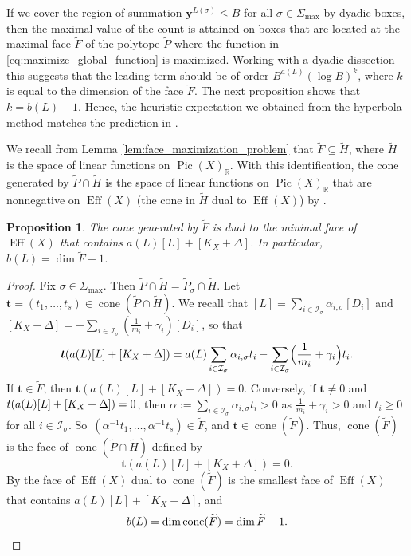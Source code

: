 \documentclass[JEP,XML,SOM,Unicode,published]{cedram}
\newcommand{\bfy}{\boldsymbol{y}}
\newcommand{\bft}{\boldsymbol{t}}
\newcommand\RR{\mathbb{R}}
\newcommand{\ic}[1]{\mathcal{I}_{#1}}
\DeclareMathOperator{\cone}{cone}
\DeclareMathOperator{\pic}{Pic}
\DeclareMathOperator{\eff}{Eff}
\newtheorem{prop}[theorem]{Proposition}
\theoremstyle{definition}
\numberwithin{theorem}{section}
\begin{document}
If we cover the region of summation $\bfy^{L(\sigma)}\leq B$ for all $\sigma\in\Sigma_{\max}$
by dyadic boxes, then the maximal value of the count is attained on boxes
that are located at the maximal face $\widetilde{F}$ of the polytope $\widetilde{P}$ where the function
in \eqref{eq:maximize_global_function} is maximized.
Working with a dyadic dissection this suggests that the leading term should be
of order $B^{a(L)} (\log B)^k$, where $k$ is equal to the dimension of the face $\widetilde{F}$.
The next proposition shows that $k=b(L)-1$.
Hence, the heuristic expectation we obtained from the hyperbola method matches
the prediction in \cite[Conj.\,1.1]{PSTVA}.

We recall from Lemma \ref{lem:face_maximization_problem} that
$\widetilde F\subseteq\widetilde H$, where $\widetilde H$
is the space of linear functions on $\pic(X)_\RR$.
With this identification, the cone generated by $\widetilde P\cap \widetilde H$ is the space
of linear functions on $\pic(X)_{\RR}$ that are nonnegative on $\eff(X)$
(\ie the cone in $\widetilde H$ dual to $\eff(X)$) by \cite[Prop.\,1.2.8]{MR2810322}.

\begin{prop}
\label{prop:description_b}
The cone generated by $\widetilde F$ is dual to the minimal face of $\eff(X)$ that contains
$a(L)[L]+[K_X+\Delta]$. In particular, $b(L)= \dim \widetilde F+1$.
\end{prop}
\begin{proof}
Fix $\sigma\in\Sigma_{\max}$.
Then $\widetilde P\cap \widetilde H=\widetilde P_\sigma\cap \widetilde H$.
Let $\bft=(t_1,\dots,t_s)\in \cone(\widetilde P\cap \widetilde H)$.
We recall that $[L] = \sum_{i\in\ic{\sigma}} \alpha_{i,\sigma} [D_{i}]$ and
$[K_X+\Delta] = -\sum_{i\in\ic{\sigma}}(\frac 1{m_i} + \gamma_i)[D_{i}]$, so that
\[
\bft(a(L)[L] + [K_X+\Delta])
= a(L) \sum_{i\in\ic{\sigma}}\alpha_{i,\sigma} t_i
- \sum_{i\in\ic{\sigma}} \Bigl(\frac 1{m_i} + \gamma_i \Bigr) t_i.
\]
If $\bft\in \widetilde F$, then $\bft (a(L)[L] + [K_X+\Delta]) =0$.
Conversely, if $\bft\neq0$ and $t (a(L)[L] + [K_X+\nobreak\Delta]) =0$,
then $\alpha:=\sum_{i\in\ic{\sigma}}\alpha_{i,\sigma} t_i > 0$ as $\frac 1{m_i} + \gamma_i>0$
and $t_i\geq0$ for all $i\in\ic{\sigma}$.
So~$(\alpha^{-1}t_1,\dots,\alpha^{-1}t_s)\in \widetilde F$, and $\bft\in \cone(\widetilde F)$.
Thus, $\cone(\widetilde F)$ is the face of $\cone(\widetilde P\cap \widetilde H)$ defined by
\[
\bft(a(L)[L] + [K_X+\Delta]) =0.
\]
By \cite[Def.\,1.2.5, Prop.\,1.2.10]{MR2810322} the face of
$\eff(X)$ dual to $\cone(\widetilde F)$ is
the smallest face of $\eff(X)$ that contains $a(L)[L] + [K_X+\Delta]$, and
\begin{equation*}b(L)=\dim \cone(\widetilde F) = \dim \widetilde F+1.\qedhere\end{equation*}
\end{proof}
\end{document}
